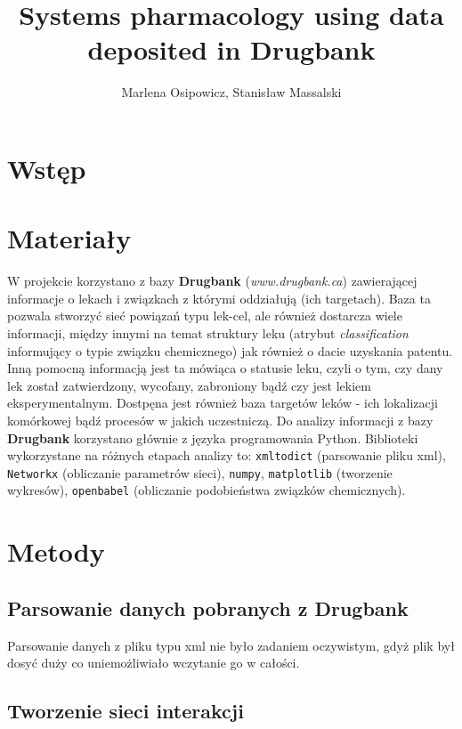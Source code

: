 \documentclass[11pt]{article}
\begin{document}
\author{Marlena Osipowicz, Stanisław Massalski}
\title{Systems pharmacology using data deposited in Drugbank}
\maketitle



\section{Wstęp}


\section{Materiały}

W projekcie korzystano z bazy \textbf{Drugbank} (\textit{www.drugbank.ca}) zawierającej informacje o lekach i związkach z którymi oddziałują (ich targetach). Baza ta pozwala stworzyć sieć powiązań typu lek-cel, ale również dostarcza wiele informacji, między innymi na temat struktury leku (atrybut \textit{classification} informujący o typie związku chemicznego) jak również o dacie uzyskania patentu. Inną pomocną informacją jest ta mówiąca o statusie leku, czyli o tym, czy dany lek został zatwierdzony, wycofany, zabroniony bądź czy jest lekiem eksperymentalnym. Dostpęna jest również baza targetów leków - ich lokalizacji komórkowej bądź procesów w jakich uczestniczą.
\newline
Do analizy informacji z bazy \textbf{Drugbank} korzystano głównie z języka programowania Python. Biblioteki wykorzystane na różnych etapach analizy to: \texttt{xmltodict} (parsowanie pliku xml), \texttt{Networkx} (obliczanie parametrów sieci), \texttt{numpy}, \texttt{matplotlib} (tworzenie wykresów), \texttt{openbabel} (obliczanie podobieństwa związków chemicznych).


\section{Metody}

\subsection{Parsowanie danych pobranych z Drugbank}

Parsowanie danych z pliku typu xml nie było zadaniem oczywistym, gdyż plik był dosyć duży co uniemożliwiało wczytanie go w całości.

\subsection{Tworzenie sieci interakcji}
\end{document}

